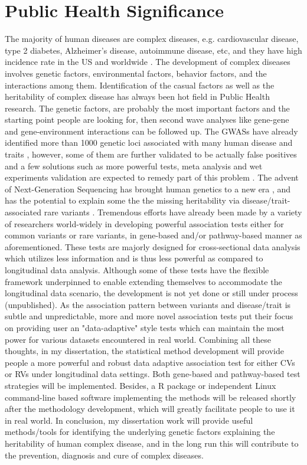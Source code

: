 \documentclass[12pt]{article}
\begin{document}
\section{Public Health Significance}
The majority of human diseases are complex diseases, e.g. cardiovascular disease, type 2 diabetes, Alzheimer's disease, autoimmune disease, etc, and they have high incidence rate in the US and worldwide \cite{Craig2008,Cardon2001,Hirschhorn2005}. The development of complex diseases involves genetic factors, environmental factors, behavior factors, and the interactions among them. Identification of the casual factors as well as the heritability of complex disease has always been hot field in Public Health research. The genetic factors, are probably the most important factors and the starting point people are looking for, then second wave analyses like gene-gene and gene-environment interactions can be followed up. The GWASs have already identified more than 1000 genetic loci associated with many human disease and traits \cite{Hindorff2009}, however, some of them are further validated to be actually false positives and a few solutions such as more powerful tests, meta analysis and wet experiments validation are expected to remedy part of this problem \cite{Wang2005,Hirschhorn2005,McCarthy2008,Hindorff2009,Cantor2010}. The advent of Next-Generation Sequencing has brought human genetics to a new era \cite{Ansorge2009,Metzker2009,Mardis2008,Shendure2008}, and has the potential to explain some the the missing heritability via disease/trait-associated rare variants \cite{Eichler2010}. Tremendous efforts have already been made by a variety of researchers world-widely in developing powerful association tests either for common variants or rare variants, in gene-based and/or pathway-based manner as aforementioned. These tests are majorly designed for cross-sectional data analysis which utilizes less information and is thus less powerful as compared to longitudinal data analysis. Although some of these tests have the flexible framework underpinned to enable extending themselves to accommodate the longitudinal data scenario, the development is not yet done or still under process (unpublished). As the association pattern between variants and disease/trait is subtle and unpredictable, more and more novel association tests put their focus on providing user an "data-adaptive" style tests which can maintain the most power for various datasets encountered in real world. Combining all these thoughts, in my dissertation, the statistical method development will provide people a more powerful and robust data adaptive association test for either CVs or RVs under longitudinal data settings. Both gene-based and pathway-based test strategies will be implemented. Besides, a R package or independent Linux command-line based software implementing the methods will be released shortly after the methodology development, which will greatly facilitate people to use it in real world. In conclusion, my dissertation work will provide useful methods/tools for identifying the underlying genetic factors explaining the heritability of human complex disease, and in the long run this will contribute to the prevention, diagnosis and cure of complex diseases.
\end{document}
